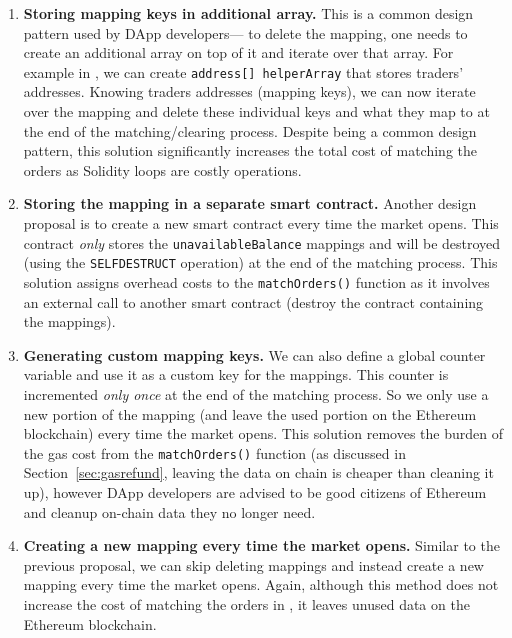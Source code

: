 \begin{enumerate}

\item \textbf{Storing mapping keys in additional array.} This is a common design pattern used by DApp developers--- to delete the mapping, one needs to create an additional array on top of it and iterate over that array. For example in \cm, we can create \texttt{address[] helperArray} that stores traders' addresses. Knowing traders addresses (\ie mapping keys), we can now iterate over the mapping and delete these individual keys and what they map to at the end of the matching/clearing process. Despite being a common design pattern, this solution 
significantly increases the total cost of matching the orders as Solidity loops are costly operations. 


\item \textbf{Storing the mapping in a separate smart contract.} Another design proposal is to create a new smart contract every time the market opens. This contract \textit{only} stores the \texttt{unavailableBalance} mappings and will be destroyed (using the \texttt{SELFDESTRUCT} operation) at the end of the matching process. This solution assigns overhead costs to the \texttt{matchOrders()} function as it involves an external call to another smart contract (\ie destroy the contract containing the mappings).


\item \textbf{Generating custom mapping keys.} We can also define a global counter variable and use it as a custom key for the mappings. This counter is incremented \textit{only once} at the end of the matching process. So we only use a new portion of the mapping (and leave the used portion on the Ethereum blockchain) every time the market opens. This solution removes the burden of the gas cost from the \texttt{matchOrders()} function (as discussed in Section~\ref{sec:gasrefund}, leaving the data on chain is cheaper than cleaning it up), however DApp developers are advised to be good citizens of Ethereum and cleanup on-chain data they no longer need. 

\item \textbf{Creating a new mapping every time the market opens.} Similar to the previous proposal, we can skip deleting mappings and instead create a new mapping every time the market opens. Again, although this method does not increase the cost of matching the orders in \cm, it leaves unused data on the Ethereum blockchain. 



\end{enumerate}


